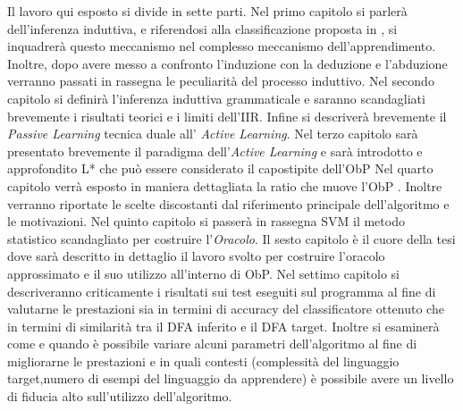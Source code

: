 Il lavoro qui esposto si divide in sette parti. Nel primo capitolo si parlerà dell'inferenza induttiva, e riferendosi alla classificazione proposta in \cite{Mic86a}, si inquadrerà questo meccanismo nel complesso meccanismo dell'apprendimento.
Inoltre, dopo avere messo a confronto l'induzione con la deduzione e l'abduzione verranno passati in rassegna le peculiarità del processo induttivo.
Nel secondo capitolo si definirà l'inferenza induttiva grammaticale e saranno scandagliati brevemente i risultati teorici e i limiti dell'\ac{IIR}. Infine si descriverà brevemente il \textit{Passive Learning} tecnica duale all' \textit{Active Learning}.
Nel terzo capitolo sarà presentato brevemente il paradigma dell'\textit{Active Learning} e sarà introdotto e approfondito L* \cite{Angluin87} che può essere considerato il capostipite dell'\ac{ObP}
Nel quarto capitolo verrà esposto in maniera dettagliata la ratio che muove l'\ac{ObP} . Inoltre verranno riportate le scelte discostanti dal riferimento principale dell'algoritmo \cite{Howar12} e le motivazioni.
Nel quinto capitolo si passerà in rassegna \ac{SVM} il metodo statistico scandagliato per costruire l'\textit{Oracolo}.
Il sesto capitolo è il cuore della tesi dove sarà descritto in dettaglio il lavoro  svolto per costruire l'oracolo approssimato e il suo utilizzo all'interno di \ac{ObP}.
Nel settimo capitolo si descriveranno criticamente i risultati sui test eseguiti sul programma al fine di valutarne le prestazioni sia in termini di accuracy del classificatore ottenuto che in termini di similarità tra il \ac{DFA} inferito e il \ac{DFA} target. Inoltre si esaminerà come e quando è possibile variare alcuni parametri dell'algoritmo al fine di migliorarne le prestazioni e in quali contesti (complessità del linguaggio target,numero di esempi del linguaggio da apprendere) è possibile avere un livello di fiducia alto sull'utilizzo dell'algoritmo. 